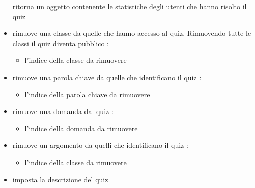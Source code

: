 \begin{itemize}
\newline
ritorna un oggetto contenente le statistiche degli utenti che hanno risolto il quiz
\newline
\item {}
\newline
rimuove una classe da quelle che hanno accesso al quiz. Rimuovendo tutte le classi il quiz diventa pubblico
\newline
{} :
\begin{itemize}
\item {}
\newline
l'indice della classe da rimuovere
\end{itemize}
\item {}
\newline
rimuove una parola chiave da quelle che identificano il quiz
\newline
{} :
\begin{itemize}
\item {}
\newline
l'indice della parola chiave da rimuovere
\end{itemize}
\item {}
\newline
rimuove una domanda dal quiz
\newline
{} :
\begin{itemize}
\item {}
\newline
l'indice della domanda da rimuovere
\end{itemize}
\item {}
\newline
rimuove un argomento da quelli che identificano il quiz
\newline
{} :
\begin{itemize}
\item {}
\newline
l'indice della classe da rimuovere
\end{itemize}
\item {}
\newline
imposta la descrizione del quiz
\newline

\end{itemize}
